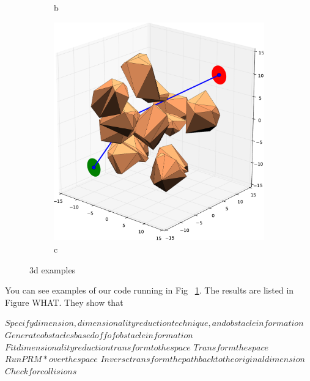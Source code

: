 \documentclass[12pt]{article}
\newcommand{\Function}[1]{\ensuremath{{\small \textsc{#1}}}}
\begin{document}
\begin{figure}[t!]
\begin{subfigure}[t]{0.3\textwidth}
        \caption{b}
    \end{subfigure}
    \begin{subfigure}[t]{0.3\textwidth}
        \centering
        \includegraphics[width=\textwidth]{3d_example_3.pdf}
        \caption{c}
    \end{subfigure}
    \caption{3d examples}
    \label{fig:3d_examples}
\end{figure}

You can see examples of our code running in Fig ~\ref{fig:3d_examples}. The results are listed in Figure WHAT. They show that 

\begin{algorithm}[ht] 
    \caption{$\Function{Dimensionality Reduction}$}
    \label{algo:DR}
    \begin{algorithmic}[1]
        \setcounter{ALC@line}{0}
        \vspace*{1mm}

        \STATE $Specify dimension, dimensionality reduction technique, and obstacle information$
        \STATE $Generate obstacles based off of obstacle information$
        \STATE $Fit dimensionality reduction transform to the space$
        \STATE $Transform the space$
        \STATE $Run PRM* over the space$
        \STATE $Inverse transform the path back to the original dimension$
        \STATE $Check for collisions$
    \end{algorithmic}
\end{algorithm}
\end{document}
